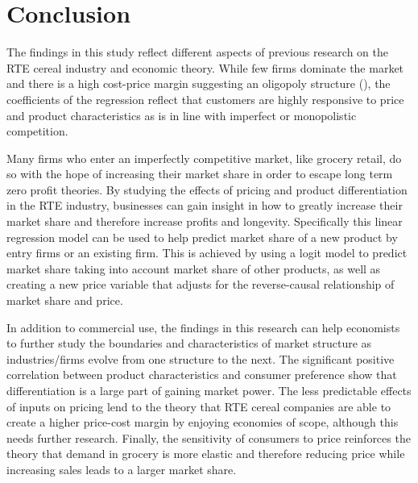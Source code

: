 \documentclass[12pt,english]{article}
\begin{document}
\section{Conclusion}

\tab The findings in this study reflect different aspects of previous research on the RTE cereal industry and economic theory. While few firms dominate the market and there is a high cost-price margin suggesting an oligopoly structure (\cite{Nevo2001}), the coefficients of the regression reflect that customers are highly responsive to price and product characteristics as is in line with imperfect or monopolistic competition. 

\tab Many firms who enter an imperfectly competitive market, like grocery retail, do so with the hope of increasing their market share in order to escape long term zero profit theories. By studying the effects of pricing and product differentiation in the RTE industry, businesses can gain insight in how to greatly increase their market share and therefore increase profits and longevity.  Specifically this linear regression model can be used to help predict market share of a new product by entry firms or an existing firm. This is achieved by using a logit model to predict market share taking into account market share of other products, as well as creating a new price variable that adjusts for the reverse-causal relationship of market share and price.

\tab In addition to commercial use, the findings in this research can help economists to further study the boundaries and characteristics of market structure as industries/firms evolve from one structure to the next. The significant positive correlation between product characteristics and consumer preference show that differentiation is a large part of gaining market power. The less predictable effects of inputs on pricing lend to the theory that RTE cereal companies are able to create a higher price-cost margin by enjoying economies of scope, although this needs further research. Finally, the sensitivity of consumers to price reinforces the theory that demand in grocery is more elastic and therefore reducing price while increasing sales leads to a larger market share.

\vfill
\pagebreak{}
\begin{spacing}{1.0}

\nocite{*}

\end{spacing}

\vfill
\pagebreak{}
\clearpage
\end{document}
